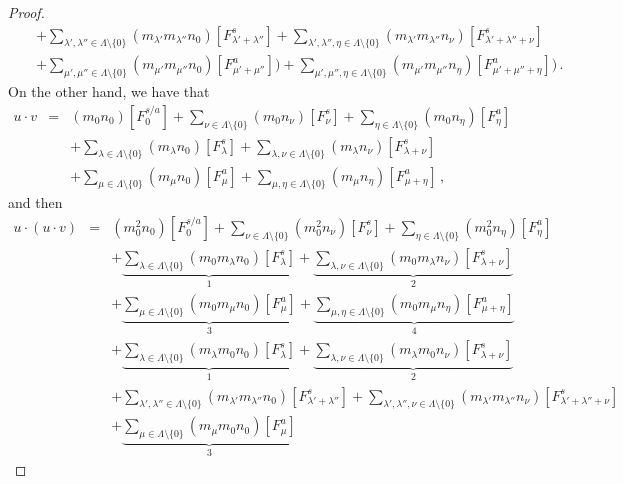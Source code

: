 \documentclass[10pt,a4paper]{amsart}
\begin{document}
\begin{proof}
\begin{eqnarray*}
			&& +\sum_{\lambda',\lambda''\in\Lambda\setminus\{0\}}(m_{\lambda'}m_{\lambda''}n_0 )
			[F_{\lambda'+\lambda''}^s ]+\sum_{\lambda',\lambda'',\eta\in\Lambda\setminus\{0\}}
			(m_{\lambda'}m_{\lambda''}n_\nu)[F_{\lambda'+\lambda''+\nu}^s ]\\
			&& +\sum_{\mu',\mu''\in\Lambda\setminus\{0\}}(m_{\mu'}m_{\mu''}n_0 )[F_{\mu'+\mu''}^a ])
			+\sum_{\mu',\mu'',\eta\in\Lambda\setminus\{0\}}(m_{\mu'}m_{\mu''}n_\eta)[F_{\mu'+\mu''+\eta}^a ])\,.
		\end{eqnarray*}
		On the other hand, we have that
		\begin{eqnarray*}
			u\cdot v & = & (m_0 n_0 )[F_0^{s/a}]+\sum_{\nu\in\Lambda\setminus\{0\}}(m_0 n_\nu)[F_\nu^s ]
			+\sum_{\eta\in\Lambda\setminus\{0\}}(m_0 n_\eta)[F_\eta^a ]\\
			&& +\sum_{\lambda\in\Lambda\setminus\{0\}}(m_\lambda n_0 )[F_\lambda^s ]
			+\sum_{\lambda,\nu\in\Lambda\setminus\{0\}}(m_\lambda n_\nu)[F_{\lambda+\nu}^s ]\\
			&& +\sum_{\mu\in\Lambda\setminus\{0\}}(m_\mu n_0 )[F_\mu^a ]
			+\sum_{\mu,\eta\in\Lambda\setminus\{0\}}(m_\mu n_\eta)[F_{\mu+\eta}^a ]\,,
		\end{eqnarray*}
		and then
		\begin{eqnarray*}
			u\cdot(u\cdot v) & = & (m_0^2 n_0 )[F_0^{s/a}]+\sum_{\nu\in\Lambda\setminus\{0\}}(m_0^2 n_\nu)
			[F_\nu^s ]+\sum_{\eta\in\Lambda\setminus\{0\}}(m_0^2 n_\eta)[F_\eta^a ]\\
			&& +\underbrace{\sum_{\lambda\in\Lambda\setminus\{0\}}(m_0 m_\lambda n_0 )[F_\lambda^s ]}_{1}
			+\underbrace{\sum_{\lambda,\nu\in\Lambda\setminus\{0\}}(m_0 m_\lambda n_\nu)[F_{\lambda+\nu}^s ]}_{2}\\
			&& +\underbrace{\sum_{\mu\in\Lambda\setminus\{0\}}(m_0 m_\mu n_0 )[F_\mu^a ]}_{3}
			+\underbrace{\sum_{\mu,\eta\in\Lambda\setminus\{0\}}(m_0 m_\mu n_\eta)[F_{\mu+\eta}^a ]}_{4}\\
			&& +\underbrace{\sum_{\lambda\in\Lambda\setminus\{0\}}(m_\lambda m_0 n_0 )[F_\lambda^s ]}_{1}
			+\underbrace{\sum_{\lambda,\nu\in\Lambda\setminus\{0\}}(m_\lambda m_0 n_\nu)[F_{\lambda+\nu}^s ]}_{2}\\
			&& +\sum_{\lambda',\lambda''\in\Lambda\setminus\{0\}}(m_{\lambda'}m_{\lambda''}n_0 )
			[F_{\lambda'+\lambda''}^s ]
			+\sum_{\lambda',\lambda'',\nu\in\Lambda\setminus\{0\}}(m_{\lambda'}m_{\lambda''}n_\nu)
			[F_{\lambda'+\lambda''+\nu}^s ]\\
			&& +\underbrace{\sum_{\mu\in\Lambda\setminus\{0\}}(m_\mu m_0 n_0 )[F_\mu^a ]}_{3}

\end{eqnarray*}
\end{proof}
\end{document}
